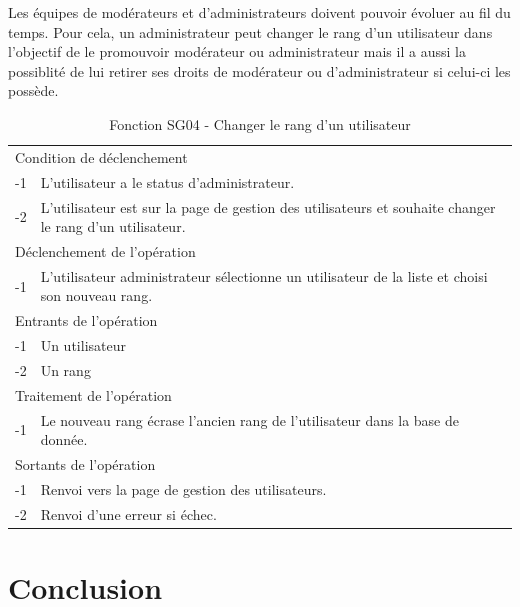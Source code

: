 \documentclass[a4paper]{article}
\begin{document}
Les équipes de modérateurs et d'administrateurs doivent pouvoir évoluer au fil du temps. Pour cela, un administrateur peut changer le rang d'un utilisateur dans l'objectif de le promouvoir modérateur ou administrateur mais il a aussi la possiblité de lui retirer ses droits de modérateur ou d'administrateur si celui-ci les possède.

\begin{table}[H]
  \centering
   \small
	\begin{tabular}{|c|p{12cm}|}
   		\hline
   			\rowcolor{lightgray}\multicolumn{2}{|c|}{\textbf{Fonction SG04 - Changer le rang d'un utilisateur}} \\
   		\hline
   			\multicolumn{2}{|l|}{Condition de déclenchement} \\
   		\hline
   			-1 & L'utilisateur a le status d'administrateur.\\
        	-2 & L'utilisateur est sur la page de gestion des utilisateurs et souhaite changer le rang d'un utilisateur.\\
   		\hline
   			\multicolumn{2}{|l|}{Déclenchement de l'opération} \\
   		\hline
   			-1 & L'utilisateur administrateur sélectionne un utilisateur de la liste et choisi son nouveau rang.\\
   		\hline
   			\multicolumn{2}{|l|}{Entrants de l'opération} \\
   		\hline
   			-1 & Un utilisateur\\
            -2 & Un rang\\
   		\hline
   			\multicolumn{2}{|l|}{Traitement de l'opération} \\
  		\hline
   			-1 & Le nouveau rang écrase l'ancien rang de l'utilisateur dans la base de donnée.\\
   		\hline
   			\multicolumn{2}{|l|}{Sortants de l'opération} \\
   		\hline
   			-1 & Renvoi vers la page de gestion des utilisateurs.\\
        	-2 & Renvoi d'une erreur si échec.\\
   		\hline
	\end{tabular}
  \caption{Fonction SG04 - Changer le rang d'un utilisateur}
  \normalsize
  \label{tab: promouvoir_utilisateur}
\end{table}

\newpage
\section*{Conclusion}
\end{document}
